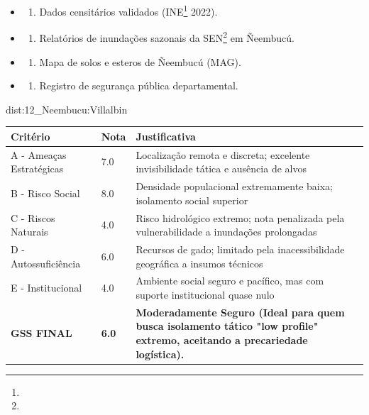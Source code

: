 {\begin{itemize}
\tightlist
\item
  \begin{enumerate}
  \def\labelenumi{\arabic{enumi})}
  \tightlist
  \item
    Dados censitários validados (INE\footnote{\fineINE} 2022).
  \end{enumerate}
\item
  \begin{enumerate}
  \def\labelenumi{\arabic{enumi})}
  \setcounter{enumi}{1}
  \tightlist
  \item
    Relatórios de inundações sazonais da SEN\footnote{\fineSEN} em Ñeembucú.
  \end{enumerate}
\item
  \begin{enumerate}
  \def\labelenumi{\arabic{enumi})}
  \setcounter{enumi}{2}
  \tightlist
  \item
    Mapa de solos e esteros de Ñeembucú (MAG).
  \end{enumerate}
\item
  \begin{enumerate}
  \def\labelenumi{\arabic{enumi})}
  \setcounter{enumi}{3}
  \tightlist
  \item
    Registro de segurança pública departamental.
  \end{enumerate}
\end{itemize}}{dist:12_Neembucu:Villalbin}
\begin{table}[ht!]
\small \begin{tabular}{p{3.0cm}p{0.8cm}p{6.0cm}} \toprule
\textbf{Critério} & \textbf{Nota} & \textbf{Justificativa} \\ \midrule
A - Ameaças Estratégicas & 7.0 & Localização remota e discreta; excelente invisibilidade tática e ausência de alvos \\
B - Risco Social & 8.0 & Densidade populacional extremamente baixa; isolamento social superior \\
C - Riscos Naturais & 4.0 & Risco hidrológico extremo; nota penalizada pela vulnerabilidade a inundações prolongadas \\
D - Autossuficiência & 6.0 & Recursos de gado; limitado pela inacessibilidade geográfica a insumos técnicos \\
E - Institucional & 4.0 & Ambiente social seguro e pacífico, mas com suporte institucional quase nulo \\
\midrule \textbf{GSS FINAL} & \textbf{6.0} & \textbf{Moderadamente Seguro (Ideal para quem busca isolamento tático "low profile" extremo, aceitando a precariedade logística).} \\ \bottomrule \end{tabular}
\end{table}
